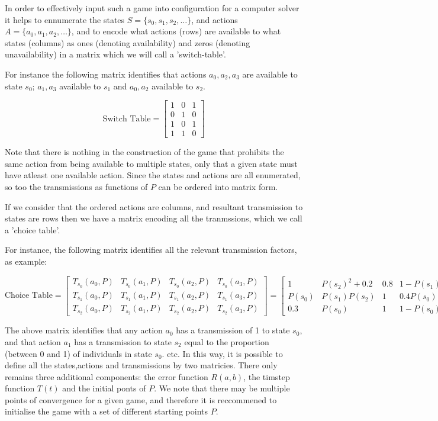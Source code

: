 \documentclass[journal,article,accept,oneauthors,pdftex,10pt,a4paper]{mdpi}
\begin{document}
In order to effectively input such a game into configuration for a computer solver it helps to ennumerate the states $S=\{s_0,s_1,s_2,\dots\}$, and actions $A=\{a_0,a_1,a_2,\dots\}$, and to encode what actions (rows) are available to what states (columns) as ones (denoting availability) and zeros (denoting unavailability) in a matrix which we will call a 'switch-table'.

For instance the following matrix identifies that actions $a_0,a_2,a_3$ are available to state $s_0$; $a_1,a_3$ available to $s_1$ and $a_0,a_2$ available to $s_2$.

$$ \text{Switch Table}= \begin{bmatrix}
    1&0&1 \\
    0&1&0 \\
    1&0&1 \\
    1&1&0
\end{bmatrix} $$

Note that there is nothing in the construction of the game that prohibits the same action from being available to multiple states, only that a given state must have atleast one available action.
Since the states and actions are all enumerated, so too the transmissions as functions of $P$ can be ordered into matrix form.

If we consider that the ordered actions are columns, and resultant transmission to states are rows then we have a matrix encoding all the tranmssions, which we call a 'choice table'.

For instance, the following matrix identifies all the relevant transmission factors, as example:

$$ \text{Choice Table} = \begin{bmatrix}
    T_{s_{0}}(a_0,P)&T_{s_{0}}(a_1,P)&T_{s_{0}}(a_2,P)&T_{s_{0}}(a_3,P) \\
    T_{s_{1}}(a_0,P)&T_{s_{1}}(a_1,P)&T_{s_{1}}(a_2,P)&T_{s_{1}}(a_3,P) \\
    T_{s_{2}}(a_0,P)&T_{s_{2}}(a_1,P)&T_{s_{2}}(a_2,P)&T_{s_{2}}(a_3,P)
\end{bmatrix} = \begin{bmatrix}
    1&P(s_2)^2+0.2&0.8&1-P(s_1)\\
    P(s_0)&P(s_1)P(s_2)&1&0.4P(s_0)\\
    0.3&P(s_0)&1&1-P(s_0)
\end{bmatrix} $$

The above matrix identifies that any action $a_0$ has a transmission of 1 to state $s_0$, and that action $a_1$ has a transmission to state $s_2$ equal to the proportion (between 0 and 1) of individuals in state $s_0$. etc.
In this way, it is possible to define all the states,actions and transmissions by two matricies.
There only remains three additional components: the error function $R(a,b)$, the timstep function $T(t)$ and the initial ponts of $P$.
We note that there may be multiple points of convergence for a given game, and therefore it is reccommened to initialise the game with a set of different starting points $P$.
\end{document}
